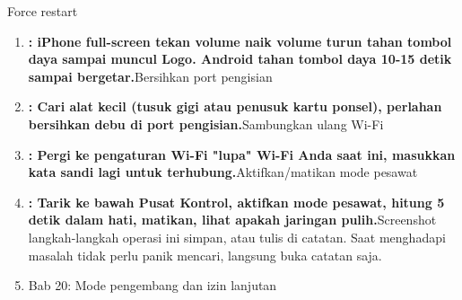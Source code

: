 \begin{tcbpractice}{Force restart}
\begin{enumerate}
  \item \textbf{: iPhone full-screen tekan volume naik volume turun tahan tombol daya sampai muncul Logo. Android tahan tombol daya 10-15 detik sampai bergetar.}Bersihkan port pengisian
  \item \textbf{: Cari alat kecil (tusuk gigi atau penusuk kartu ponsel), perlahan bersihkan debu di port pengisian.}Sambungkan ulang Wi-Fi
  \item \textbf{: Pergi ke pengaturan Wi-Fi "lupa" Wi-Fi Anda saat ini, masukkan kata sandi lagi untuk terhubung.}Aktifkan/matikan mode pesawat
  \item \textbf{: Tarik ke bawah Pusat Kontrol, aktifkan mode pesawat, hitung 5 detik dalam hati, matikan, lihat apakah jaringan pulih.}Screenshot langkah-langkah operasi ini simpan, atau tulis di catatan. Saat menghadapi masalah tidak perlu panik mencari, langsung buka catatan saja.
  \item Bab 20: Mode pengembang dan izin lanjutan
\end{enumerate}

\end{tcbpractice}
